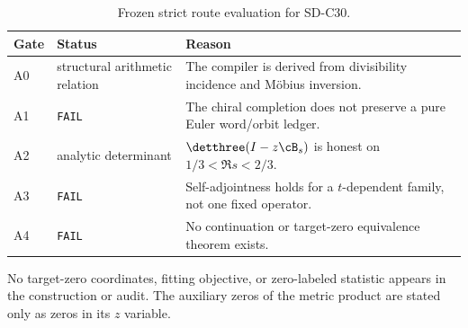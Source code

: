 \begin{table}[H]
\centering
\small
\begin{tabularx}{\textwidth}{L{1.4cm}L{4.0cm}Y}
\toprule
Gate & Status & Reason\\
\midrule
A0 & structural arithmetic relation &
The compiler is derived from divisibility incidence and M\"obius inversion.\\
A1 & \texttt{FAIL} &
The chiral completion does not preserve a pure Euler word/orbit ledger.\\
A2 & analytic determinant &
$\detthree(I-z\cB_s)$ is honest on $1/3<\Re s<2/3$.\\
A3 & \texttt{FAIL} &
Self-adjointness holds for a $t$-dependent family, not one fixed operator.\\
A4 & \texttt{FAIL} &
No continuation or target-zero equivalence theorem exists.\\
\bottomrule
\end{tabularx}
\caption{Frozen strict route evaluation for SD-C30.}
\label{tab:route}
\end{table}

\begin{center}
\end{center}

No target-zero coordinates, fitting objective, or zero-labeled
statistic appears in the construction or audit.  The auxiliary zeros
of the metric product are stated only as zeros in its $z$ variable.
